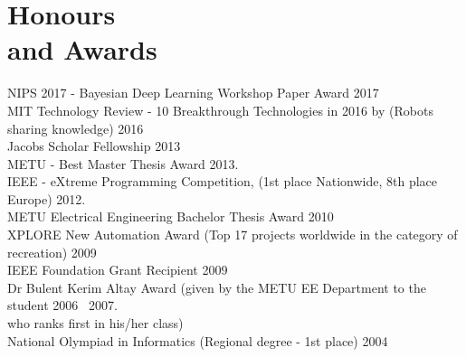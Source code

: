 
\section{\mysidestyle \textcolor{olgray}{Honours \\and Awards}}
NIPS 2017 - Bayesian Deep Learning Workshop Paper Award \hfill 2017 \vspace{1mm}\\
MIT Technology Review - 10 Breakthrough Technologies in 2016 by  (Robots sharing knowledge) \hfill 2016 \vspace{1mm}\\
Jacobs Scholar Fellowship \hfill 2013 \vspace{1mm}\\
METU - Best Master Thesis Award \hfill  2013{\color{white}.}\vspace{1mm}\\
IEEE - eXtreme Programming Competition,  (1st place Nationwide, 8th place Europe) \hfill 2012{\color{white}.}\vspace{1mm}\\
METU Electrical Engineering Bachelor Thesis Award  \hfill 2010 \vspace{1mm}\vspace{1mm}\\
XPLORE New Automation Award (Top 17 projects worldwide in the category of recreation)  \hfill 2009 \vspace{1mm}\vspace{1mm}\\
IEEE Foundation Grant Recipient \hfill 2009 \vspace{1mm}\vspace{1mm}\\
Dr Bulent Kerim Altay Award  (given by the METU EE Department to the student \hfill 2006 \textendash ~2007{\color{white}.}\\ who ranks first in his/her class) \vspace{1mm}\vspace{1mm}\\
National Olympiad in Informatics (Regional degree - 1st place) \hfill 2004 \vspace{1mm}\vspace{1mm}\\
\vspace{-4mm}
